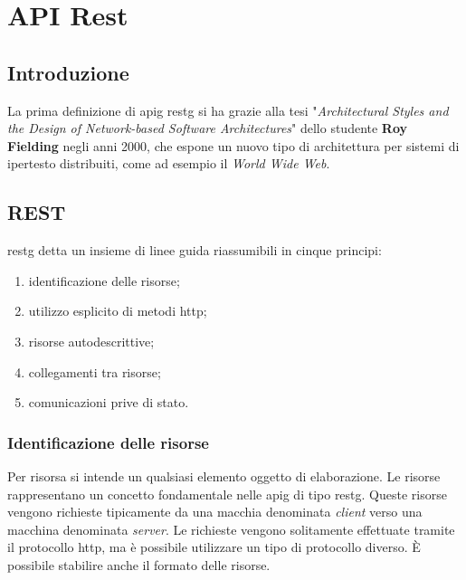

\chapter{API Rest}

\section{Introduzione}
La prima definizione di \gls{apig} \gls{restg} si ha grazie alla tesi
"\textit{Architectural Styles and the Design of Network-based Software
	Architectures}" dello studente \textbf{Roy Fielding} negli anni 2000, che
espone un nuovo tipo di architettura per sistemi di ipertesto distribuiti, come
ad esempio il \textit{World Wide Web}.

\section{REST}

\gls{restg} detta un insieme di linee guida riassumibili in cinque principi:
\begin{enumerate}
	\item identificazione delle risorse;
	\item utilizzo esplicito di metodi \gls{http};
	\item risorse autodescrittive;
	\item collegamenti tra risorse;
	\item comunicazioni prive di stato.
\end{enumerate}

\subsection{Identificazione delle risorse}
Per risorsa si intende un qualsiasi elemento oggetto di elaborazione.
Le risorse rappresentano un concetto fondamentale nelle \gls{apig} di tipo
\gls{restg}. Queste risorse vengono richieste tipicamente da una macchia
denominata \textit{client} verso una macchina denominata \textit{server}. Le
richieste vengono solitamente effettuate tramite il protocollo \gls{http}, ma è
possibile utilizzare un tipo di protocollo diverso. È possibile stabilire anche
il formato delle risorse.

